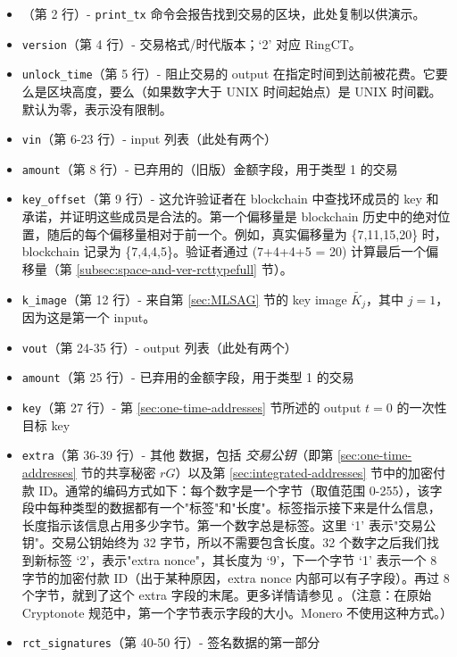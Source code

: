 \begin{appendices}
\begin{itemize}
    \item （第 2 行）- {\tt print\_tx} 命令会报告找到交易的区块，此处复制以供演示。
	\item {\tt version}（第 4 行）- 交易格式/时代版本；`2' 对应 RingCT。
	\item {\tt unlock\_time}（第 5 行）- 阻止交易的 output 在指定时间到达前被花费。它要么是区块高度，要么（如果数字大于 UNIX 时间起始点）是 UNIX 时间戳。默认为零，表示没有限制。
	\item {\tt vin}（第 6-23 行）- input 列表（此处有两个）
	\item {\tt amount}（第 8 行）- 已弃用的（旧版）金额字段，用于类型 1 的交易
	\item {\tt key\_offset}（第 9 行）- 这允许验证者在 blockchain 中查找环成员的 key 和承诺，并证明这些成员是合法的。第一个偏移量是 blockchain 历史中的绝对位置，随后的每个偏移量相对于前一个。例如，真实偏移量为 \{7,11,15,20\} 时，blockchain 记录为 \{7,4,4,5\}。验证者通过 (7+4+4+5 = 20) 计算最后一个偏移量（第 \ref{subsec:space-and-ver-rcttypefull} 节）。
	\item {\tt k\_image}（第 12 行）- 来自第 \ref{sec:MLSAG} 节的 key image \(\tilde{K_j}\)，其中 $j = 1$，因为这是第一个 input。
	\item {\tt vout}（第 24-35 行）- output 列表（此处有两个）
	\item {\tt amount}（第 25 行）- 已弃用的金额字段，用于类型 1 的交易
	\item {\tt key}（第 27 行）- 第 \ref{sec:one-time-addresses} 节所述的 output $t = 0$ 的一次性目标 key
	\item {\tt extra}（第 36-39 行）- 其他 数据，包括 {\em 交易公钥}（即第 \ref{sec:one-time-addresses} 节的共享秘密 $r G$）以及第 \ref{sec:integrated-addresses} 节中的加密付款 ID。通常的编码方式如下：每个数字是一个字节（取值范围 0-255），该字段中每种类型的数据都有一个"标签"和"长度"。标签指示接下来是什么信息，长度指示该信息占用多少字节。第一个数字总是标签。这里 `1' 表示"交易公钥"。交易公钥始终为 32 字节，所以不需要包含长度。32 个数字之后我们找到新标签 `2'，表示"extra nonce"，其长度为 `9'，下一个字节 `1' 表示一个 8 字节的加密付款 ID（出于某种原因，extra nonce 内部可以有子字段）。再过 8 个字节，就到了这个 extra 字段的末尾。更多详情请参见 \cite{extra-field-stackexchange}。（注意：在原始 Cryptonote 规范中，第一个字节表示字段的大小。Monero 不使用这种方式。）\cite{tx-extra-field}
	\item {\tt rct\_signatures}（第 40-50 行）- 签名数据的第一部分

\end{itemize}
\end{appendices}
